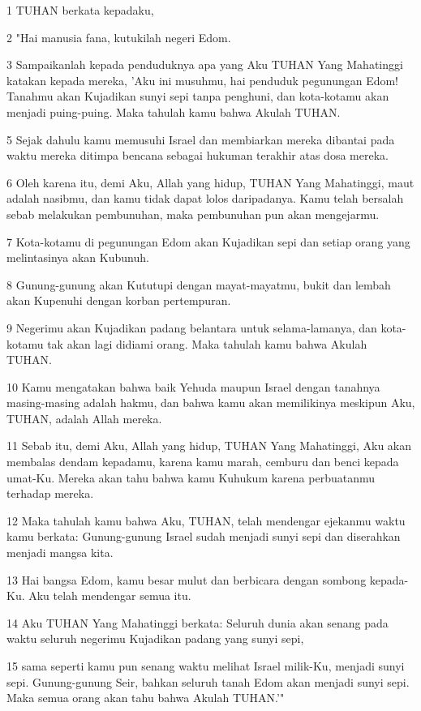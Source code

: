 \par 1 TUHAN berkata kepadaku,
\par 2 "Hai manusia fana, kutukilah negeri Edom.
\par 3 Sampaikanlah kepada penduduknya apa yang Aku TUHAN Yang Mahatinggi katakan kepada mereka, 'Aku ini musuhmu, hai penduduk pegunungan Edom! Tanahmu akan Kujadikan sunyi sepi tanpa penghuni, dan kota-kotamu akan menjadi puing-puing. Maka tahulah kamu bahwa Akulah TUHAN.
\par 5 Sejak dahulu kamu memusuhi Israel dan membiarkan mereka dibantai pada waktu mereka ditimpa bencana sebagai hukuman terakhir atas dosa mereka.
\par 6 Oleh karena itu, demi Aku, Allah yang hidup, TUHAN Yang Mahatinggi, maut adalah nasibmu, dan kamu tidak dapat lolos daripadanya. Kamu telah bersalah sebab melakukan pembunuhan, maka pembunuhan pun akan mengejarmu.
\par 7 Kota-kotamu di pegunungan Edom akan Kujadikan sepi dan setiap orang yang melintasinya akan Kubunuh.
\par 8 Gunung-gunung akan Kututupi dengan mayat-mayatmu, bukit dan lembah akan Kupenuhi dengan korban pertempuran.
\par 9 Negerimu akan Kujadikan padang belantara untuk selama-lamanya, dan kota-kotamu tak akan lagi didiami orang. Maka tahulah kamu bahwa Akulah TUHAN.
\par 10 Kamu mengatakan bahwa baik Yehuda maupun Israel dengan tanahnya masing-masing adalah hakmu, dan bahwa kamu akan memilikinya meskipun Aku, TUHAN, adalah Allah mereka.
\par 11 Sebab itu, demi Aku, Allah yang hidup, TUHAN Yang Mahatinggi, Aku akan membalas dendam kepadamu, karena kamu marah, cemburu dan benci kepada umat-Ku. Mereka akan tahu bahwa kamu Kuhukum karena perbuatanmu terhadap mereka.
\par 12 Maka tahulah kamu bahwa Aku, TUHAN, telah mendengar ejekanmu waktu kamu berkata: Gunung-gunung Israel sudah menjadi sunyi sepi dan diserahkan menjadi mangsa kita.
\par 13 Hai bangsa Edom, kamu besar mulut dan berbicara dengan sombong kepada-Ku. Aku telah mendengar semua itu.
\par 14 Aku TUHAN Yang Mahatinggi berkata: Seluruh dunia akan senang pada waktu seluruh negerimu Kujadikan padang yang sunyi sepi,
\par 15 sama seperti kamu pun senang waktu melihat Israel milik-Ku, menjadi sunyi sepi. Gunung-gunung Seir, bahkan seluruh tanah Edom akan menjadi sunyi sepi. Maka semua orang akan tahu bahwa Akulah TUHAN.'"


